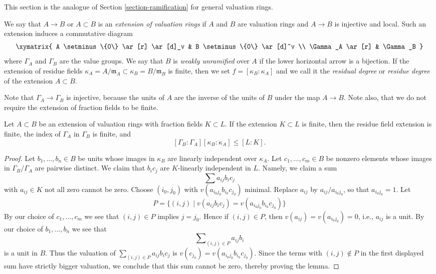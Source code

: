\noindent
This section is the analogue of Section \ref{section-ramification}
for general valuation rings.

\begin{definition}
\label{definition-extension-valuation-rings}
We say that $A \to B$ or $A \subset B$ is an
{\it extension of valuation rings} if $A$ and $B$ are
valuation rings and $A \to B$ is injective and local.
Such an extension induces a commutative diagram
$$
\xymatrix{
A \setminus \{0\} \ar[r] \ar[d]_v & B \setminus \{0\} \ar[d]^v \\
\Gamma_A \ar[r] & \Gamma_B
}
$$
where $\Gamma_A$ and $\Gamma_B$ are the value groups.
We say that $B$ is {\it weakly unramified} over $A$ if
the lower horizontal arrow is a bijection.
If the extension of residue fields
$\kappa_A = A/\mathfrak m_A \subset \kappa_B = B/\mathfrak m_B$
is finite, then we set $f = [\kappa_B : \kappa_A]$ and we
call it the {\it residual degree} or {\it residue degree}
of the extension $A \subset B$.
\end{definition}

\noindent
Note that $\Gamma_A \to \Gamma_B$ is injective, because the units
of $A$ are the inverse of the units of $B$ under the map $A \to B$.
Note also, that we do not require the extension of fraction fields
to be finite.

\begin{lemma}
\label{lemma-inequality-general}
Let $A \subset B$ be an extension of valuation rings with
fraction fields $K \subset L$. If the extension $K \subset L$
is finite, then the residue field extension is finite,
the index of $\Gamma_A$ in $\Gamma_B$ is finite, and
$$
[\Gamma_B : \Gamma_A] [\kappa_B : \kappa_A] \leq [L : K].
$$
\end{lemma}

\begin{proof}
Let $b_1, \ldots, b_n \in B$ be units whose images in $\kappa_B$
are linearly independent over $\kappa_A$. Let $c_1, \ldots, c_m \in B$
be nonzero elements whose images in $\Gamma_B/\Gamma_A$ are pairwise
distinct. We claim that $b_i c_j$ are $K$-linearly independent
in $L$. Namely, we claim a sum
$$
\sum a_{ij} b_i c_j
$$
with $a_{ij} \in K$ not all zero cannot be zero. Choose $(i_0, j_0)$ with
$v(a_{i_0j_0}b_{i_0}c_{j_0})$ minimal. Replace $a_{ij}$ by
$a_{ij}/a_{i_0j_0}$, so that $a_{i_0 j_0} = 1$. Let
$$
P = \{(i, j) \mid
v(a_{ij}b_ic_j) = v(a_{i_0j_0}b_{i_0}c_{j_0}) \}
$$
By our choice of $c_1, \ldots, c_m$ we see that $(i, j) \in P$ implies
$j = j_0$. Hence if $(i, j) \in P$, then $v(a_{ij}) = v(a_{i_0j_0}) = 0$,
i.e., $a_{ij}$ is a unit. By our choice of $b_1, \ldots, b_n$
we see that
$$
\sum\nolimits_{(i, j) \in P} a_{ij}b_i
$$
is a unit in $B$. Thus the valuation of
$\sum\nolimits_{(i, j) \in P} a_{ij}b_ic_j$ is
$v(c_{j_0}) = v(a_{i_0j_0}b_{i_0}c_{j_0})$.
Since the terms with $(i, j) \not \in P$ in the first displayed sum
have strictly bigger valuation, we conclude that this sum cannot be
zero, thereby proving the lemma.
\end{proof}

